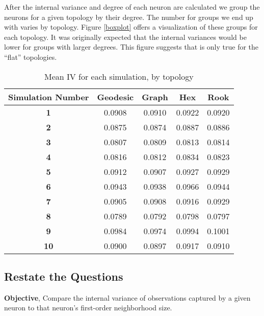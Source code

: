 After the internal variance and degree of each neuron are calculated we
group the neurons for a given topology by their degree. The number for groups
we end up with varies by topology. Figure \ref{boxplot} offers a visualization
of these groups for each topology.  It was originally expected that the
internal variances would be lower for groups with larger degrees. This figure
suggests that is only true for the ``flat'' topologies.

\begin{table}
\centering
\caption{Mean IV for each simulation, by topology}
\label{ivtable3}
\begin{tabular}{|c||c|c|c|c|}
\hline
\textbf{Simulation Number} & Geodesic & Graph & Hex & Rook \\
\hline
\hline
\textbf{1} & 0.0908 & 0.0910 & 0.0922 & 0.0920 \\
\hline
\textbf{2} & 0.0875 & 0.0874 & 0.0887 & 0.0886 \\
\hline
\textbf{3} & 0.0807 & 0.0809 & 0.0813 & 0.0814 \\
\hline
\textbf{4} & 0.0816 & 0.0812 & 0.0834 & 0.0823 \\
\hline
\textbf{5} & 0.0912 & 0.0907 & 0.0927 & 0.0929 \\
\hline
\textbf{6} & 0.0943 & 0.0938 & 0.0966 & 0.0944 \\
\hline
\textbf{7} & 0.0905 & 0.0908 & 0.0916 & 0.0929 \\
\hline
\textbf{8} & 0.0789 & 0.0792 & 0.0798 & 0.0797 \\
\hline
\textbf{9} & 0.0984 & 0.0974 & 0.0994 & 0.1001 \\
\hline
\textbf{10} & 0.0900 & 0.0897 & 0.0917 & 0.0910 \\
\hline
\end{tabular} \end{table}



\subsection{Restate the Questions}
\textbf{Objective}, Compare the internal variance of observations captured by a given
neuron to that neuron's first-order neighborhood size.

